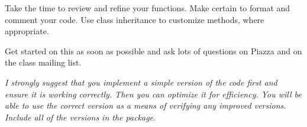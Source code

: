 \documentclass{article}
\begin{document}
Take the time to review and refine your functions.  Make certain to
format and comment your code.  Use class inheritance
to customize methods, where appropriate.

Get started on this as soon as possible and ask lots
of questions on Piazza and on the class mailing list.

\textit{
I strongly suggest that you implement a simple version of the code first
and ensure it is working correctly. Then you can optimize it for efficiency.
You will be able to use the correct version as a means of verifying any improved
versions. Include all of the versions in the package.
}
\end{document}
